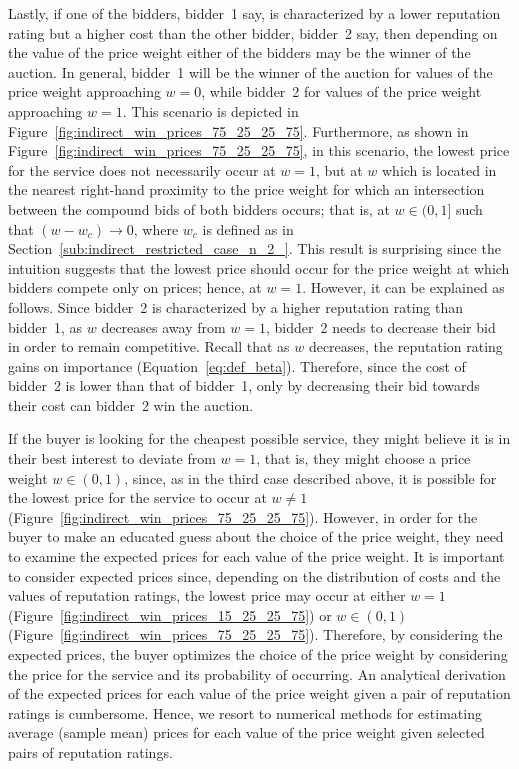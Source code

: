 Lastly, if one of the bidders, bidder~1 say, is characterized by a lower reputation rating but a higher cost than the other bidder, bidder~2 say, then depending on the value of the price weight either of the bidders may be the winner of the auction. In general, bidder~1 will be the winner of the auction for values of the price weight approaching $w=0$, while bidder~2 for values of the price weight approaching $w=1$. This scenario is depicted in Figure~\ref{fig:indirect_win_prices_75_25_25_75}. Furthermore, as shown in Figure~\ref{fig:indirect_win_prices_75_25_25_75}, in this scenario, the lowest price for the service does not necessarily occur at $w=1$, but at $w$ which is located in the nearest right-hand proximity to the price weight for which an intersection between the compound bids of both bidders occurs; that is, at $w\in (0,1]$ such that $(w - w_c)\to 0$, where $w_c$ is defined as in Section~\ref{sub:indirect_restricted_case_n_2_}. This result is surprising since the intuition suggests that the lowest price should occur for the price weight at which bidders compete only on prices; hence, at $w=1$. However, it can be explained as follows. Since bidder~2 is characterized by a higher reputation rating than bidder~1, as $w$ decreases away from $w=1$, bidder~2 needs to decrease their bid in order to remain competitive. Recall that as $w$ decreases, the reputation rating gains on importance (Equation~\eqref{eq:def_beta}). Therefore, since the cost of bidder~2 is lower than that of bidder~1, only by decreasing their bid towards their cost can bidder~2 win the auction.

If the buyer is looking for the cheapest possible service, they might believe it is in their best interest to deviate from $w=1$, that is, they might choose a price weight $w\in(0,1)$, since, as in the third case described above, it is possible for the lowest price for the service to occur at $w\neq 1$ (Figure~\ref{fig:indirect_win_prices_75_25_25_75}). However, in order for the buyer to make an educated guess about the choice of the price weight, they need to examine the expected prices for each value of the price weight. It is important to consider expected prices since, depending on the distribution of costs and the values of reputation ratings, the lowest price may occur at either $w=1$ (Figure~\ref{fig:indirect_win_prices_15_25_25_75}) or $w\in(0,1)$ (Figure~\ref{fig:indirect_win_prices_75_25_25_75}). Therefore, by considering the expected prices, the buyer optimizes the choice of the price weight by considering the price for the service and its probability of occurring. An analytical derivation of the expected prices for each value of the price weight given a pair of reputation ratings is cumbersome. Hence, we resort to numerical methods for estimating average (sample mean) prices for each value of the price weight given selected pairs of reputation ratings.

